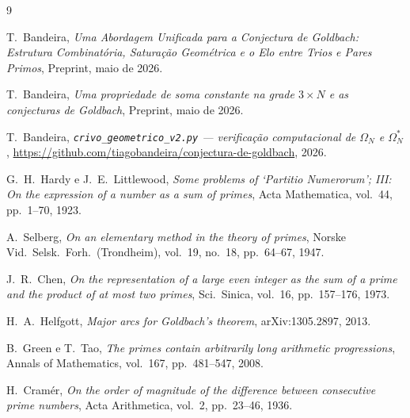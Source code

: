 \documentclass[12pt,a4paper]{article}
\theoremstyle{definition}
\theoremstyle{remark}
\begin{document}
	\begin{thebibliography}{9}
		
		T.~Bandeira,
		\textit{Uma Abordagem Unificada para a Conjectura de Goldbach:
			Estrutura Combinatória, Saturação Geométrica e o Elo entre Trios e
			Pares Primos},
		Preprint, maio de 2026.
		
		T.~Bandeira,
		\textit{Uma propriedade de soma constante na grade $3\times N$
			e as conjecturas de Goldbach},
		Preprint, maio de 2026.
		
		T.~Bandeira,
		\textit{\texttt{crivo\_geometrico\_v2.py} --- verificação computacional
			de $\Omega_N$ e $\Omega^*_N$},
		\url{https://github.com/tiagobandeira/conjectura-de-goldbach}, 2026.
		
		G.~H.~Hardy e J.~E.~Littlewood,
		\textit{Some problems of `Partitio Numerorum'; III: On the expression
			of a number as a sum of primes},
		Acta Mathematica, vol.~44, pp.~1--70, 1923.
		
		A.~Selberg,
		\textit{On an elementary method in the theory of primes},
		Norske Vid.\ Selsk.\ Forh.\ (Trondheim), vol.~19, no.~18,
		pp.~64--67, 1947.
		
		J.~R.~Chen,
		\textit{On the representation of a large even integer as the sum of
			a prime and the product of at most two primes},
		Sci.\ Sinica, vol.~16, pp.~157--176, 1973.
		
		H.~A.~Helfgott,
		\textit{Major arcs for Goldbach's theorem},
		arXiv:1305.2897, 2013.
		
		B.~Green e T.~Tao,
		\textit{The primes contain arbitrarily long arithmetic progressions},
		Annals of Mathematics, vol.~167, pp.~481--547, 2008.
		
		H.~Cramér,
		\textit{On the order of magnitude of the difference between consecutive
			prime numbers},
		Acta Arithmetica, vol.~2, pp.~23--46, 1936.
		
	\end{thebibliography}
	
\end{document}
